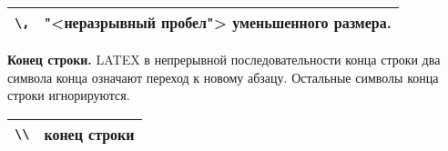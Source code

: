 \begin{table*}[h!]
    \begin{tabular}{|l|p{}|}
        \hline
        \verb|\,| & "<неразрывный пробел"> уменьшенного размера.\\
        \hline
    \end{tabular}
\end{table*}

\textbf{Конец строки.} LATEX в непрерывной последовательности конца строки два символа конца означают переход к новому абзацу. Остальные символы конца строки игнорируются.

\begin{table*}[h!]
    \begin{tabular}{|l|p{}|}
        \hline
        \verb|\\| & конец строки\\
        \hline
    \end{tabular}
\end{table*}

\clearpage